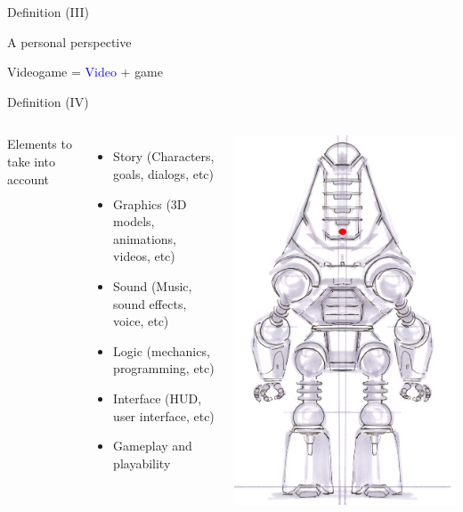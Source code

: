\documentclass[10pt,compress]{beamer} %
\begin{document}
\begin{frame}{Definition (III)}
	\begin{center}
	A personal perspective
	\end{center}

	\begin{center}
	\huge Videogame = \textcolor{blue}{Video} + \alert{game}
	\end{center}

\end{frame}

\begin{frame}{Definition (IV)}
    \begin{columns}
		Elements to take into account

 	 	\begin{itemize}
		\item Story (Characters, goals, dialogs, etc)
		\item Graphics (3D models, animations, videos, etc)
		\item Sound (Music, sound effects, voice, etc)
		\item Logic (mechanics, programming, etc)
		\item Interface (\alert{HUD}, user interface, etc)
		\item \alert{Gameplay} and playability
		\end{itemize}

		\centering\includegraphics[width=0.7\linewidth]{figs/ProtectronCA2}\\
	\end{columns}
\end{frame}
\end{document}
